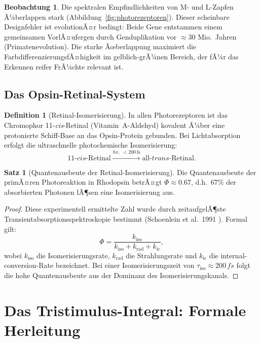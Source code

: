 ﻿\documentclass[a4paper,12pt]{article}
\theoremstyle{definition}
\newtheorem{definition}{Definition}
\newtheorem{satz}{Satz}
\newtheorem{beobachtung}{Beobachtung}
\begin{document}
\begin{beobachtung}
Die spektralen Empfindlichkeiten von M- und L-Zapfen Ã¼berlappen stark
(Abbildung~\ref{fig:photorezeptoren}). Dieser scheinbare Designfehler ist
evolutionÃ¤r bedingt: Beide Gene entstammen einem gemeinsamen VorlÃ¤ufergen
durch Genduplikation vor $\approx 30$ Mio.\ Jahren (Primatenevolution).
Die starke Ãœberlappung maximiert die FarbdifferenzierungsfÃ¤higkeit im
gelblich-grÃ¼nen Bereich, der fÃ¼r das Erkennen reifer FrÃ¼chte relevant ist.
\end{beobachtung}

\subsection{Das Opsin-Retinal-System}

\begin{definition}[Retinal-Isomerisierung]
In allen Photorezeptoren ist das Chromophor 11-\textit{cis}-Retinal (Vitamin~A-Aldehyd)
kovalent Ã¼ber eine protonierte Schiff-Base an das Opsin-Protein gebunden.
Bei Lichtabsorption erfolgt die ultraschnelle photochemische Isomerisierung:
\[
  11\text{-}\textit{cis}\text{-Retinal} \xrightarrow{h\nu,\; < 200\,\mathrm{fs}} \text{all-}\textit{trans}\text{-Retinal}.
\]
\end{definition}

\begin{satz}[Quantenausbeute der Retinal-Isomerisierung]
Die Quantenausbeute der primÃ¤ren Photoreaktion in Rhodopsin betrÃ¤gt
$\Phi \approx 0.67$, d.h.\ $67\%$ der absorbierten Photonen lÃ¶sen eine Isomerisierung aus.
\end{satz}

\begin{proof}
Diese experimentell ermittelte Zahl wurde durch zeitaufgelÃ¶ste Transientabsorptionsspektroskopie
bestimmt (Schoenlein et al.\ 1991 \cite{schoenlein1991}). Formal gilt:
\[
  \Phi = \frac{k_\mathrm{iso}}{k_\mathrm{iso} + k_\mathrm{rad} + k_\mathrm{ic}},
\]
wobei $k_\mathrm{iso}$ die Isomerisierungsrate, $k_\mathrm{rad}$ die Strahlungsrate und
$k_\mathrm{ic}$ die internal-conversion-Rate bezeichnet.
Bei einer Isomerisierungszeit von $\tau_\mathrm{iso} \approx 200\,\si{fs}$ folgt
die hohe Quantenausbeute aus der Dominanz des Isomerisierungskanals.
\end{proof}

\section{Das Tristimulus-Integral: Formale Herleitung}
\end{document}

